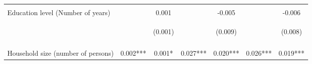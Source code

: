 \begin{center}
\begin{tabular}{lcccccc}
\vspace{4pt} & \begin{footnotesize}\end{footnotesize} & \begin{footnotesize}[0.572]\end{footnotesize} & \begin{footnotesize}\end{footnotesize} & \begin{footnotesize}[0.401]\end{footnotesize} & \begin{footnotesize}\end{footnotesize} & \begin{footnotesize}[0.335]\end{footnotesize} \\
Education level (Number of years) &  & 0.001 &  & -0.005 &  & -0.006 \\
 & \begin{footnotesize}\end{footnotesize} & \begin{footnotesize}(0.001)\end{footnotesize} & \begin{footnotesize}\end{footnotesize} & \begin{footnotesize}(0.009)\end{footnotesize} & \begin{footnotesize}\end{footnotesize} & \begin{footnotesize}(0.008)\end{footnotesize} \\
\vspace{4pt} & \begin{footnotesize}\end{footnotesize} & \begin{footnotesize}[0.676]\end{footnotesize} & \begin{footnotesize}\end{footnotesize} & \begin{footnotesize}[0.563]\end{footnotesize} & \begin{footnotesize}\end{footnotesize} & \begin{footnotesize}[0.487]\end{footnotesize} \\
Household size (number of persons) & 0.002*** & 0.001* & 0.027*** & 0.020*** & 0.026*** & 0.019*** \\

\end{tabular}
\end{center}
